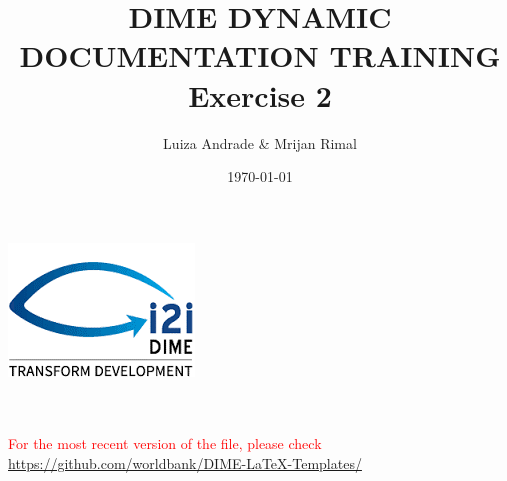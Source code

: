 \documentclass[12pts]{article}
\title{DIME DYNAMIC DOCUMENTATION TRAINING \\ Exercise 2}
\author{Luiza Andrade \& Mrijan Rimal}
\date{\today}
\begin{document}
	
	
	\makeatletter
	\begin{titlepage}
		\begin{center}
			\includegraphics[width=0.3\linewidth]{../img/i2i.png}\\[10ex]
			{\LARGE \bfseries  \@title }\\[2ex] 
			{\Large  \@author}\\[20ex] 
			{\large \@date}
		\end{center}
	\textcolor{red}{For the most recent version of the file, please check \url{https://github.com/worldbank/DIME-LaTeX-Templates/}}
	\end{titlepage}
	\makeatother
	
	\tableofcontents
	
\end{document}
